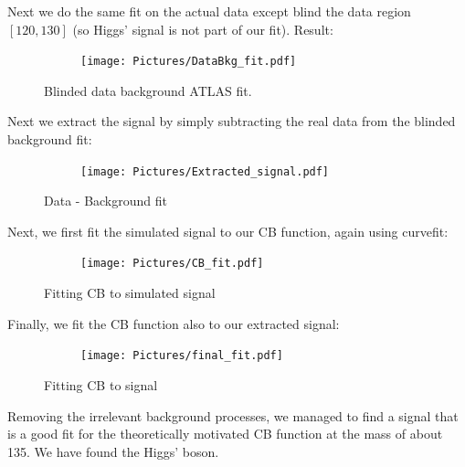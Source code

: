 \documentclass{article}
\begin{document}
Next we do the same fit on the actual data except blind the data region $[120,130]$ (so Higgs' signal is not part of our fit). Result:
\begin{figure}[H]
\centering
\begin{subfigure}{.7\textwidth}
\texttt{[image: Pictures/DataBkg\_fit.pdf]}
\end{subfigure}
\caption*{Blinded data background ATLAS fit.}
\end{figure}

Next we extract the signal by simply subtracting the real data from the blinded background fit:
\begin{figure}[H]
\centering
\begin{subfigure}{.7\textwidth}
\texttt{[image: Pictures/Extracted\_signal.pdf]}
\end{subfigure}
\caption*{Data - Background fit}
\end{figure}

Next, we first fit the simulated signal to our CB function, again using curvefit:
\begin{figure}[H]
\centering
\begin{subfigure}{.7\textwidth}
\texttt{[image: Pictures/CB\_fit.pdf]}
\end{subfigure}
\caption*{Fitting CB to simulated signal}
\end{figure}

Finally, we fit the CB function also to our extracted signal:
\begin{figure}[H]
\centering
\begin{subfigure}{.7\textwidth}
\texttt{[image: Pictures/final\_fit.pdf]}
\end{subfigure}
\caption*{Fitting CB to signal}
\end{figure}

Removing the irrelevant background processes, we managed to find a signal that is a good fit for the theoretically motivated CB function at the mass of about 135. We have found the Higgs' boson.
\end{document}
